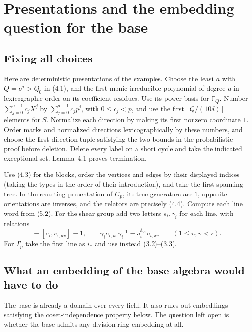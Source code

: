 \documentclass[11pt,a4paper]{article}
\numberwithin{equation}{section}
\begin{document}
\section{Presentations and the embedding question for the base}

\subsection{Fixing all choices}

Here are deterministic presentations of the examples. Choose the least $a$
with $Q=p^a>Q_0$ in (4.1), and the first monic irreducible polynomial of
degree $a$ in lexicographic order on its coefficient residues. Use its
power basis for $\mathbb F_Q$. Number $\sum_{j=0}^{a-1}c_jX^j$ by
$\sum_{j=0}^{a-1}c_jp^j$, with $0\leq c_j<p$, and use the first
$\lfloor Q/(10d)\rfloor$ elements for $S$. Normalize each direction by
making its first nonzero coordinate $1$. Order marks and normalized
directions lexicographically by these numbers, and choose the first
direction tuple satisfying the two bounds in the probabilistic proof before
deletion. Delete every label on a short cycle and take the indicated
exceptional set. Lemma~4.1 proves termination.

Use (4.3) for the blocks, order the vertices and edges by their displayed
indices (taking the types in the order of their introduction), and take the
first spanning tree. In the resulting presentation of $G_p$, its tree
generators are $1$, opposite orientations are inverses, and the relators are
precisely (4.4). Compute each line word from (5.2). For the shear group add
two letters $s_i,\gamma_i$ for each line, with relations
\begin{equation}
 [s_i,\gamma_i]=[s_i,e_{i,uv}]=1,\qquad
 \gamma_i e_{i,uv}\gamma_i^{-1}=s_i^{\delta_{uv}}e_{i,uv}
     \qquad(1\leq u,v<r).
 \label{eq:line-shear-presentation}
\end{equation}
For $\Gamma_p$ take the first line as $i_*$ and use instead (3.2)--(3.3).

\subsection{What an embedding of the base algebra would have to do}

The base is already a domain over every field. It also rules out embeddings
satisfying the coset-independence property below. The question left open is
whether the base admits any division-ring embedding at all.
\end{document}
